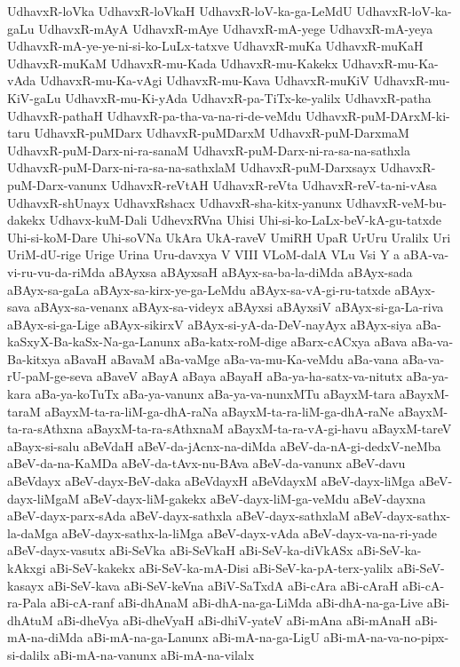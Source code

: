 {UdhavxR-loVka
UdhavxR-loVkaH
UdhavxR-loV-ka-ga-LeMdU
UdhavxR-loV-ka-gaLu
UdhavxR-mAyA
UdhavxR-mAye
UdhavxR-mA-yege
UdhavxR-mA-yeya
UdhavxR-mA-ye-ye-ni-si-ko-LuLx-tatxve
UdhavxR-muKa
UdhavxR-muKaH
UdhavxR-muKaM
UdhavxR-mu-Kada
UdhavxR-mu-Kakekx
UdhavxR-mu-Ka-vAda
UdhavxR-mu-Ka-vAgi
UdhavxR-mu-Kava
UdhavxR-muKiV
UdhavxR-mu-KiV-gaLu
UdhavxR-mu-Ki-yAda
UdhavxR-pa-TiTx-ke-yalilx
UdhavxR-patha
UdhavxR-pathaH
UdhavxR-pa-tha-va-na-ri-de-veMdu
UdhavxR-puM-DArxM-ki-taru
UdhavxR-puMDarx
UdhavxR-puMDarxM
UdhavxR-puM-DarxmaM
UdhavxR-puM-Darx-ni-ra-sanaM
UdhavxR-puM-Darx-ni-ra-sa-na-sathxla
UdhavxR-puM-Darx-ni-ra-sa-na-sathxlaM
UdhavxR-puM-Darxsayx
UdhavxR-puM-Darx-vanunx
UdhavxR-reVtAH
UdhavxR-reVta
UdhavxR-reV-ta-ni-vAsa
UdhavxR-shUnayx
UdhavxRshacx
UdhavxR-sha-kitx-yanunx
UdhavxR-veM-bu-dakekx
Udhavx-kuM-Dali
UdhevxRVna
Uhisi
Uhi-si-ko-LaLx-beV-kA-gu-tatxde
Uhi-si-koM-Dare
Uhi-soVNa
UkAra
UkA-raveV
UmiRH
UpaR
UrUru
Uralilx
Uri
UriM-dU-rige
Urige
Urina
Uru-davxya
V
VIII
VLoM-dalA
VLu
Vsi
Y
a
aBA-va-vi-ru-vu-da-riMda
aBAyxsa
aBAyxsaH
aBAyx-sa-ba-la-diMda
aBAyx-sada
aBAyx-sa-gaLa
aBAyx-sa-kirx-ye-ga-LeMdu
aBAyx-sa-vA-gi-ru-tatxde
aBAyx-sava
aBAyx-sa-venanx
aBAyx-sa-videyx
aBAyxsi
aBAyxsiV
aBAyx-si-ga-La-riva
aBAyx-si-ga-Lige
aBAyx-sikirxV
aBAyx-si-yA-da-DeV-nayAyx
aBAyx-siya
aBa-kaSxyX-Ba-kaSx-Na-ga-Lanunx
aBa-katx-roM-dige
aBarx-cACxya
aBava
aBa-va-Ba-kitxya
aBavaH
aBavaM
aBa-vaMge
aBa-va-mu-Ka-veMdu
aBa-vana
aBa-va-rU-paM-ge-seva
aBaveV
aBayA
aBaya
aBayaH
aBa-ya-ha-satx-va-nitutx
aBa-ya-kara
aBa-ya-koTuTx
aBa-ya-vanunx
aBa-ya-va-nunxMTu
aBayxM-tara
aBayxM-taraM
aBayxM-ta-ra-liM-ga-dhA-raNa
aBayxM-ta-ra-liM-ga-dhA-raNe
aBayxM-ta-ra-sAthxna
aBayxM-ta-ra-sAthxnaM
aBayxM-ta-ra-vA-gi-havu
aBayxM-tareV
aBayx-si-salu
aBeVdaH
aBeV-da-jAcnx-na-diMda
aBeV-da-nA-gi-dedxV-neMba
aBeV-da-na-KaMDa
aBeV-da-tAvx-nu-BAva
aBeV-da-vanunx
aBeV-davu
aBeVdayx
aBeV-dayx-BeV-daka
aBeVdayxH
aBeVdayxM
aBeV-dayx-liMga
aBeV-dayx-liMgaM
aBeV-dayx-liM-gakekx
aBeV-dayx-liM-ga-veMdu
aBeV-dayxna
aBeV-dayx-parx-sAda
aBeV-dayx-sathxla
aBeV-dayx-sathxlaM
aBeV-dayx-sathx-la-daMga
aBeV-dayx-sathx-la-liMga
aBeV-dayx-vAda
aBeV-dayx-va-na-ri-yade
aBeV-dayx-vasutx
aBi-SeVka
aBi-SeVkaH
aBi-SeV-ka-diVkASx
aBi-SeV-ka-kAkxgi
aBi-SeV-kakekx
aBi-SeV-ka-mA-Disi
aBi-SeV-ka-pA-terx-yalilx
aBi-SeV-kasayx
aBi-SeV-kava
aBi-SeV-keVna
aBiV-SaTxdA
aBi-cAra
aBi-cAraH
aBi-cA-ra-Pala
aBi-cA-ranf
aBi-dhAnaM
aBi-dhA-na-ga-LiMda
aBi-dhA-na-ga-Live
aBi-dhAtuM
aBi-dheVya
aBi-dheVyaH
aBi-dhiV-yateV
aBi-mAna
aBi-mAnaH
aBi-mA-na-diMda
aBi-mA-na-ga-Lanunx
aBi-mA-na-ga-LigU
aBi-mA-na-va-no-pipx-si-dalilx
aBi-mA-na-vanunx
aBi-mA-na-vilalx
}
